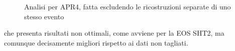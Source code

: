 \begin{figure}[H]
	\vspace{-10pt}
	\vspace{-5pt}
	\caption{Analisi per APR4, fatta escludendo le ricostruzioni separate di uno stesso evento}
	\label{fig:apr4_cut}
	\vspace{-15pt}
\end{figure}
che presenta risultati non ottimali, come avviene per la EOS SHT2, ma comunque decisamente migliori rispetto ai dati non tagliati.


